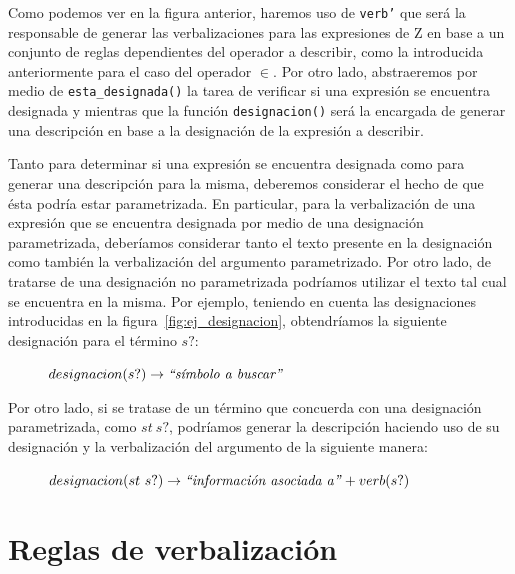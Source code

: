 Como podemos ver en la figura anterior, haremos uso de \texttt{verb'} que será la responsable de generar las verbalizaciones para las expresiones de Z en base a un conjunto de reglas dependientes del operador a describir, como la introducida anteriormente para el caso del operador $\in$. Por otro lado, abstraeremos por medio de \texttt{esta\_designada()} la tarea de verificar si una expresión se encuentra designada y mientras que la función \texttt{designacion()} será la encargada de generar una descripción en base a la designación de la expresión a describir. 


Tanto para determinar si una expresión se encuentra designada como para generar una descripción para la misma, deberemos considerar el hecho de que ésta podría estar parametrizada. En particular, para la verbalización de una expresión que se encuentra designada por medio de una designación parametrizada, deberíamos considerar tanto el texto presente en la designación como también la verbalización del argumento parametrizado. Por otro lado, de tratarse de una designación no parametrizada podríamos utilizar el texto tal cual se encuentra en la misma. Por ejemplo, teniendo en cuenta las designaciones introducidas en la figura~\ref{fig:ej_designacion}, obtendríamos la siguiente designación para el término $s?$:

\begin{figure}[H]
\center
$designacion(s?) \rightarrow \text{\emph{``símbolo a buscar''}}$
\end{figure}

\noindent
Por otro lado, si se tratase de un término que concuerda con una designación parametrizada, como $st~s?$, podríamos generar la descripción haciendo uso de su designación y la verbalización del argumento de la siguiente manera: 

\begin{figure}[H]
\center
$designacion(st~s?) \rightarrow \text{\emph{``información asociada a''}} + verb(s?)$
\end{figure}


\section{Reglas de verbalización}
\label{sec:corpus_reglas}

